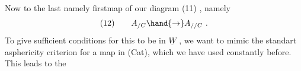 Now to the last \hand{(}namely first\hand{)}map of our diagram (11) ,  namely
\[ (12) \qquad A_{/C} \hand{\to} A_{//C} \ . \]
To give sufficient conditions for this to be in $\underline{W}$ ,  we want to mimic
the standart asphericity criterion for a map in (Cat),  which we have
used constantly before.  This leads to the 


